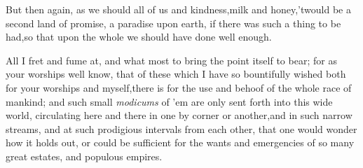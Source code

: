 \documentclass{article}
\begin{document}
But then again, as we should all of us
and kindness,\tsk\!\tsk milk and honey,\tsh ’twould be a
second land of promise,\tsh\break
a paradise upon earth, if there was
such a thing to be had,\tsk so that upon the whole we should have
done well enough.

All I fret and fume at, and what most 
to bring the point itself to bear; for as your
worships well know, that of these 
which I have so bountifully wished both for your
worships and myself,\tsk there is\break
{}
for the use and behoof of the whole race of
mankind; and such small \textit{modicums} of ’em are only sent forth
into this wide world, circulating here and there in one by corner
or another,\tsk and in such narrow streams, and at such prodigious
intervals from each other, that one would wonder how it holds out,
or could be sufficient for the wants and emergencies of so many
great estates, and populous empires.
\end{document}
